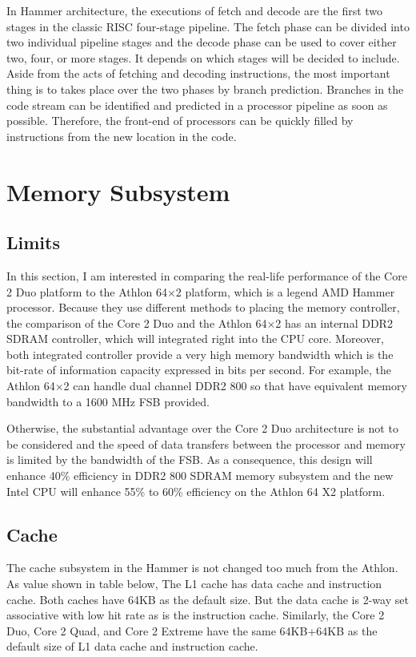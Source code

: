 \documentclass[letterpaper,10pt,compsoc,draftclsnofoot,onecolumn]{IEEEtran}
\begin{document}
In Hammer architecture, the executions of fetch and decode are the first two stages in the classic RISC four-stage pipeline\cite{redhat_amd}. The fetch phase can be divided into two individual pipeline stages and the decode phase can be used to cover either two, four, or more stages. It depends on which stages will be decided to include. Aside from the acts of fetching and decoding instructions, the most important thing is to takes place over the two phases by branch prediction. Branches in the code stream can be identified and predicted in a processor pipeline as soon as possible. Therefore, the front-end of processors can be quickly filled by instructions from the new location in the code.

\section{Memory Subsystem}
\subsection{Limits}
In this section, I am interested in comparing the real-life performance of the Core 2 Duo platform to the Athlon 64×2 platform, which is a legend AMD Hammer processor. Because they use different methods to placing the memory controller, the comparison of the Core 2 Duo and the Athlon 64×2 has an internal DDR2 SDRAM controller, which will integrated right into the CPU core\cite{pdf_amd_k8}. Moreover, both integrated controller provide a very high memory bandwidth which is the bit-rate of information capacity expressed in bits per second. For example, the Athlon 64×2 can handle dual channel DDR2 800 so that have equivalent memory bandwidth to a 1600 MHz FSB provided.

Otherwise, the substantial advantage over the Core 2 Duo architecture is not to be considered and the speed of data transfers between the processor and memory is limited by the bandwidth of the FSB. As a consequence, this design will enhance 40\% efficiency in DDR2 800 SDRAM memory subsystem and the new Intel CPU will enhance 55\% to 60\% efficiency on the Athlon 64 X2 platform\cite{hammer_amd_arch}.

\subsection{Cache}
The cache subsystem in the Hammer is not changed too much from the Athlon. As value shown in table below, The L1 cache has data cache and instruction cache. Both caches have 64KB as the default size. But the data cache is 2-way set associative with low hit rate as is the instruction cache. Similarly, the Core 2 Duo, Core 2 Quad, and Core 2 Extreme have the same 64KB+64KB as the default size of L1 data cache and instruction cache.
\end{document}
